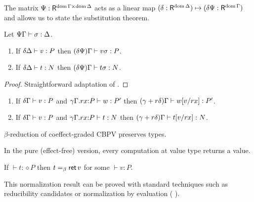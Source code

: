 \documentclass[acmsmall,review,anonymous]{acmart}\settopmatter{printfolios=true,printccs=false,printacmref=false}
\theoremstyle{remark}
\newtheorem{remark}{Remark}
\begin{document}
The matrix $\Psi : \R^{\dom \Gamma \times \dom \Delta}$ acts as a
linear map
$(\delta : \R^{\dom \Delta}) \mapsto (\delta\Psi : \R^{\dom \Gamma})$
and allows us to state the substitution theorem.
\begin{theorem}
  Let $\SubstTy \Psi \Gamma \sigma \Delta$.
  \begin{enumerate}
  \item If $\qValTy \delta \Delta v P$ then $\pValTy {\delta\Psi} \Gamma {v\sigma} P$.
  \item If $\qCompTy \delta \Delta t N$ then
    $\pCompTy {\delta\Psi} \Gamma {t\sigma} N$.
  \end{enumerate}
\end{theorem}
\begin{proof}
  Straightforward adaptation of \citet{atkeyWood:types19,woodAtkey:linearity20}.
\end{proof}
\begin{corollary}
  \label{cor:tysinglesub}
  \bla
  \begin{enumerate}
  \item If $\qValTy \delta \Gamma v P$ and
      $\ValTy {\qext \gamma \Gamma r x P} w {P'}$
      then $\pValTy {\gamma + r\delta} \Gamma {\qsubst v r x w} {P'}$.
  \item If $\qValTy \delta \Gamma v P$ and
      $\oCompTy {\qext \gamma \Gamma r x P} t {N}$
      then $\pCompTy {\gamma + r\delta} \Gamma {\qsubst v r x t} {N}$.
  \end{enumerate}
\end{corollary}
\begin{corollary}
  $\beta$-reduction of coeffect-graded CBPV preserves types.
\end{corollary}
In the pure (effect-free) version, every computation at value type
returns a value.
\begin{conjecture}
  If $\vdash t : \diamond P$ then $t =_{\beta} \ret v$ for some $\vdash v : P$.
\end{conjecture}
This normalization result can be proved with standard techniques such
as reducibility candidates or normalization by evaluation (\cf
\citet{abelSattler:ppdp19}).
\end{document}
